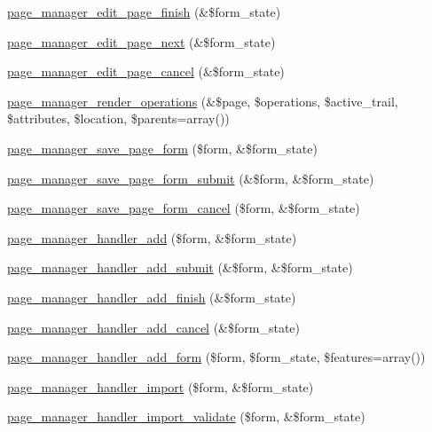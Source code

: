 \begin{DoxyCompactItemize}
\item 
\hyperlink{page__manager_8admin_8inc_adda934adb211c15b7ffb8659158f4c8d}{page\_\-manager\_\-edit\_\-page\_\-finish} (\&\$form\_\-state)
\item 
\hyperlink{page__manager_8admin_8inc_a50dd59f9db5cde973f5120337b6f4026}{page\_\-manager\_\-edit\_\-page\_\-next} (\&\$form\_\-state)
\item 
\hyperlink{page__manager_8admin_8inc_aec78e2899a33f799e9f4ebe0f3839711}{page\_\-manager\_\-edit\_\-page\_\-cancel} (\&\$form\_\-state)
\item 
\hyperlink{page__manager_8admin_8inc_a64632eddea1e6b4a366b399fdc13e95a}{page\_\-manager\_\-render\_\-operations} (\&\$page, \$operations, \$active\_\-trail, \$attributes, \$location, \$parents=array())
\item 
\hyperlink{page__manager_8admin_8inc_a0cebbb105c27764a960d2acfacd484bf}{page\_\-manager\_\-save\_\-page\_\-form} (\$form, \&\$form\_\-state)
\item 
\hyperlink{page__manager_8admin_8inc_aac2241c9cd0ac721d93f4c904a1a1293}{page\_\-manager\_\-save\_\-page\_\-form\_\-submit} (\&\$form, \&\$form\_\-state)
\item 
\hyperlink{page__manager_8admin_8inc_ae247c3127a873439c9e6bed5fd4453be}{page\_\-manager\_\-save\_\-page\_\-form\_\-cancel} (\$form, \&\$form\_\-state)
\item 
\hyperlink{page__manager_8admin_8inc_ac106674f4aa3ba8f1f3b8940f663e230}{page\_\-manager\_\-handler\_\-add} (\$form, \&\$form\_\-state)
\item 
\hyperlink{page__manager_8admin_8inc_a6d3b87ff0cfde1b8577f08f0ce1f96af}{page\_\-manager\_\-handler\_\-add\_\-submit} (\&\$form, \&\$form\_\-state)
\item 
\hyperlink{page__manager_8admin_8inc_a412bb20e91468909a7274c948887639d}{page\_\-manager\_\-handler\_\-add\_\-finish} (\&\$form\_\-state)
\item 
\hyperlink{page__manager_8admin_8inc_a47ad5fa085b38af8dec0cc441fcc770f}{page\_\-manager\_\-handler\_\-add\_\-cancel} (\&\$form\_\-state)
\item 
\hyperlink{page__manager_8admin_8inc_ae375ef3886a3426e0c46da3e4c20fdf7}{page\_\-manager\_\-handler\_\-add\_\-form} (\$form, \$form\_\-state, \$features=array())
\item 
\hyperlink{page__manager_8admin_8inc_a5d79ab1672156c501390a36eed452c48}{page\_\-manager\_\-handler\_\-import} (\$form, \&\$form\_\-state)
\item 
\hyperlink{page__manager_8admin_8inc_a6963064ee84139a0bb64d9cc1b67c55e}{page\_\-manager\_\-handler\_\-import\_\-validate} (\$form, \&\$form\_\-state)

\end{DoxyCompactItemize}
